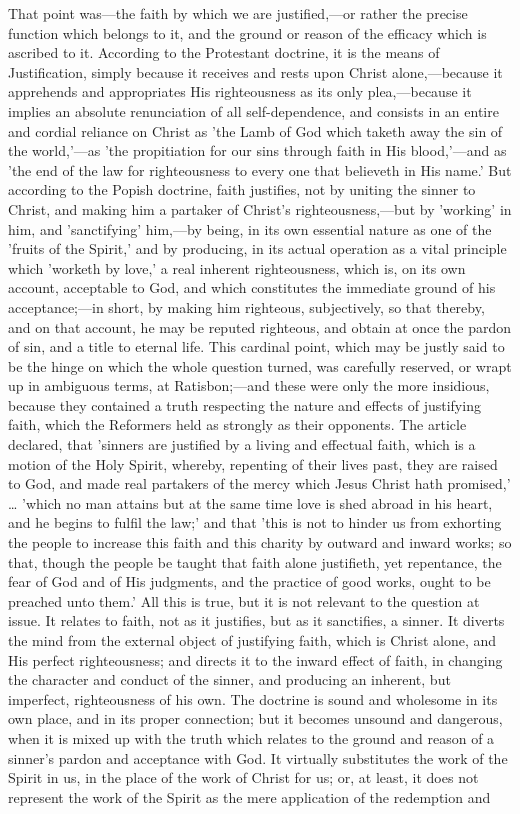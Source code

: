 \documentclass[
]{book}
\begin{document}
That point was---the faith by which we are justified,---or rather the precise function which belongs to it, and the ground or reason of the efficacy which is ascribed to it. According to the Protestant doctrine, it is the means of Justification, simply because it receives and rests upon Christ alone,---because it apprehends and appropriates His righteousness as its only plea,---because it implies an absolute renunciation of all self-dependence, and consists in an entire and cordial reliance on Christ as 'the Lamb of God which taketh away the sin of the world,'---as 'the propitiation for our sins through faith in His blood,'---and as 'the end of the law for righteousness to every one that believeth in His name.' But according to the Popish doctrine, faith justifies, not by uniting the sinner to Christ, and making him a partaker of Christ's righteousness,---but by 'working' in him, and 'sanctifying' him,---by being, in its own essential nature as one of the 'fruits of the Spirit,' and by producing, in its actual operation as a vital principle which 'worketh by love,' a real inherent righteousness, which is, on its own account, acceptable to God, and which constitutes the immediate ground of his acceptance;---in short, by making him righteous, subjectively, so that thereby, and on that account, he may be reputed righteous, and obtain at once the pardon of sin, and a title to eternal life. This cardinal point, which may be justly said to be the hinge on which the whole question turned, was carefully reserved, or wrapt up in ambiguous terms, at Ratisbon;---and these were only the more insidious, because they contained a truth respecting the nature and effects of justifying faith, which the Reformers held as strongly as their opponents. The article declared, that 'sinners are justified by a living and effectual faith, which is a motion of the Holy Spirit, whereby, repenting of their lives past, they are raised to God, and made real partakers of the mercy which Jesus Christ hath promised,' \ldots{} 'which no man attains but at the same time love is shed abroad in his heart, and he begins to fulfil the law;' and that 'this is not to hinder us from exhorting the people to increase this faith and this charity by outward and inward works; so that, though the people be taught that faith alone justifieth, yet repentance, the fear of God and of His judgments, and the practice of good works, ought to be preached unto them.' All this is true, but it is not relevant to the question at issue. It relates to faith, not as it justifies, but as it sanctifies, a sinner. It diverts the mind from the external object of justifying faith, which is Christ alone, and His perfect righteousness; and directs it to the inward effect of faith, in changing the character and conduct of the sinner, and producing an inherent, but imperfect, righteousness of his own. The doctrine is sound and wholesome in its own place, and in its proper connection; but it becomes unsound and dangerous, when it is mixed up with the truth which relates to the ground and reason of a sinner's pardon and acceptance with God. It virtually substitutes the work of the Spirit in us, in the place of the work of Christ for us; or, at least, it does not represent the work of the Spirit as the mere application of the redemption and 
\end{document}
